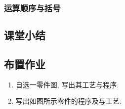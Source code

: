 \subsubsection{运算顺序与括号}
\subsection{课堂小结}

\subsection{布置作业}
\begin{enumerate}[1、]
	\item 自选一零件图, 写出其工艺与程序.
	\item 写出如图所示零件的程序及与工艺.
\end{enumerate}